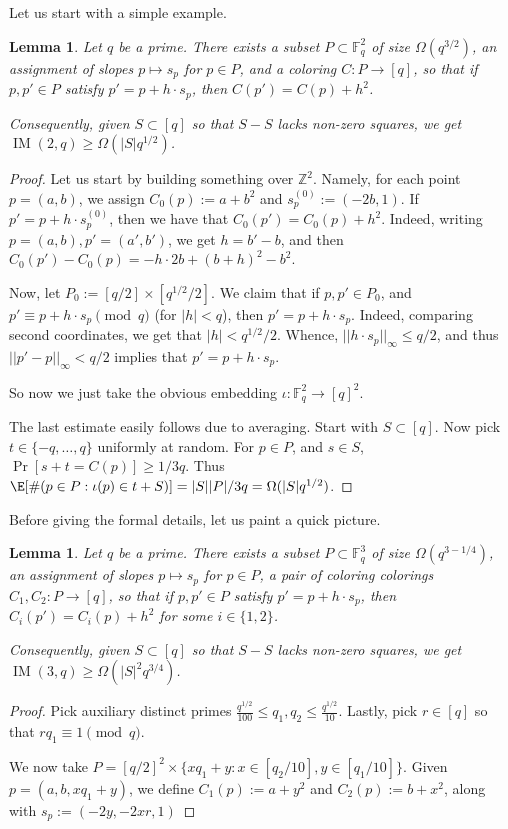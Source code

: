 \documentclass[11pt]{article}
\theoremstyle{plain}
\newtheorem{lemma}[theorem]{Lemma}
\theoremstyle{remark}
\newcommand{\F}{\mathbb F}
\newcommand{\IM}{\operatorname{IM}}
\begin{document}
Let us start with a simple example.
\begin{lemma}
    Let $q$ be a prime. There exists a subset $P\subset \F_q^2$ of size $\Omega(q^{3/2})$, an assignment of slopes $p\mapsto s_p$ for $p\in P$, and a coloring $C:P\to [q]$, so that if $p,p' \in P$ satisfy $p' = p+h\cdot s_p$, then $C(p') = C(p)+h^2$.

    Consequently, given $S\subset [q]$ so that $S-S$ lacks non-zero squares, we get $\IM(2,q)\ge \Omega(|S| q^{1/2})$.
\end{lemma}
\begin{proof}
    Let us start by building something over $\mathbb{Z}^2$. Namely, for each point $p=(a,b)$, we assign $C_0(p) := a+b^2$ and $s_p^{(0)} := (-2b,1)$. If $p'=p+h\cdot s_p^{(0)}$, then we have that $C_0(p')=C_0(p)+h^2$. Indeed, writing $p=(a,b),p'=(a',b')$, we get $h=b'-b$, and then $C_0(p')-C_0(p)= -h\cdot2b+(b+h)^2-b^2$.

    Now, let $P_0 := [q/2]\times [q^{1/2}/2]$. We claim that if $p,p'\in P_0$, and $p'\equiv p+h\cdot s_p\pmod{q}$ (for $|h|<q$), then $p' = p+h\cdot s_p$. Indeed, comparing second coordinates, we get that $|h|<q^{1/2}/2$. Whence, $||h\cdot s_p||_\infty \le q/2$, and thus $||p'-p||_\infty<q/2$ implies that $p'=p+h\cdot s_p$.

    So now we just take the obvious embedding $\iota:\F_q^2\to [q]^2$.

    The last estimate easily follows due to averaging. Start with $S\subset [q]$. Now pick $t\in \{-q,\dots,q\}$ uniformly at random. For $p\in P$, and $s\in S$, $\Pr[ s+t = C(p) ] \ge 1/3q$. Thus $\E[ \#(p\in P:\iota(p)\in t+S)] = |S||P|/3q= \Omega(|S|q^{1/2})$.
    
    

\end{proof}



Before giving the formal details, let us paint a quick picture. 
\begin{lemma}
    Let $q$ be a prime. There exists a subset $P\subset \F_q^3$ of size $\Omega(q^{3-1/4})$, an assignment of slopes $p\mapsto s_p$ for $p\in P$, a pair of coloring colorings $C_1,C_2:P\to [q]$, so that if $p,p' \in P$ satisfy $p' = p+h\cdot s_p$, then $C_i(p') = C_i(p)+h^2$ for some $i\in\{1,2\}$.

    Consequently, given $S\subset [q]$ so that $S-S$ lacks non-zero squares, we get $\IM(3,q)\ge \Omega(|S|^2 q^{3/4})$.
\end{lemma}
\begin{proof}
    Pick auxiliary distinct primes $\frac{q^{1/2}}{100}\le q_1,q_2\le \frac{q^{1/2}}{10}$. Lastly, pick $r\in [q]$ so that $rq_1\equiv 1\pmod{q}$.

    We now take $P = [q/2]^2\times \{xq_1+y: x\in [q_2/10],y\in [q_1/10]\}$. Given $p=(a,b,xq_1+y)$, we define $C_1(p):= a+y^2$ and $C_2(p) := b+x^2$, along with $s_p := (-2y,-2xr,1)$
\end{proof}
\end{document}
